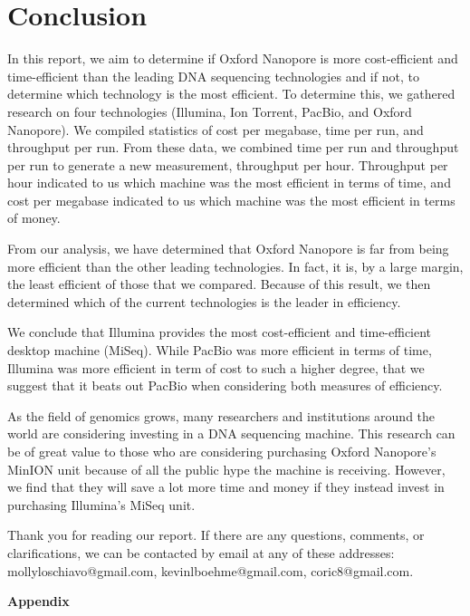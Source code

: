\documentclass[12pt,letterpaper]{report}
\begin{document}
\section{Conclusion}
In this report, we aim to determine if Oxford Nanopore is more cost-efficient and time-efficient than the leading DNA sequencing technologies and if not, to determine which technology is the most efficient. To determine this, we gathered research on four technologies (Illumina, Ion Torrent, PacBio, and Oxford Nanopore). We compiled statistics of cost per megabase, time per run, and throughput per run. From these data, we combined time per run and throughput per run to generate a new measurement, throughput per hour. Throughput per hour indicated to us which machine was the most efficient in terms of time, and cost per megabase indicated to us which machine was the most efficient in terms of money.

From our analysis, we have determined that Oxford Nanopore is far from being more efficient than the other leading technologies. In fact, it is, by a large margin, the least efficient of those that we compared. Because of this result, we then determined which of the current technologies is the leader in efficiency.

We conclude that Illumina provides the most cost-efficient and time-efficient desktop machine (MiSeq). While PacBio was more efficient in terms of time, Illumina was more efficient in term of cost to such a higher degree, that we suggest that it beats out PacBio when considering both measures of efficiency.

As the field of genomics grows, many researchers and institutions around the world are considering investing in a DNA sequencing machine. This research can be of great value to those who are considering purchasing Oxford Nanopore's MinION unit because of all the public hype the machine is receiving. However, we find that they will save a lot more time and money if they instead invest in purchasing Illumina's MiSeq unit.

Thank you for reading our report. If there are any questions, comments, or clarifications, we can be contacted by email at any of these addresses: mollyloschiavo@gmail.com, kevinlboehme@gmail.com, coric8@gmail.com.



\clearpage

\begin{center}
\Huge\textbf{Appendix}
\end{center}
\setcounter{section}{0}
\end{document}
